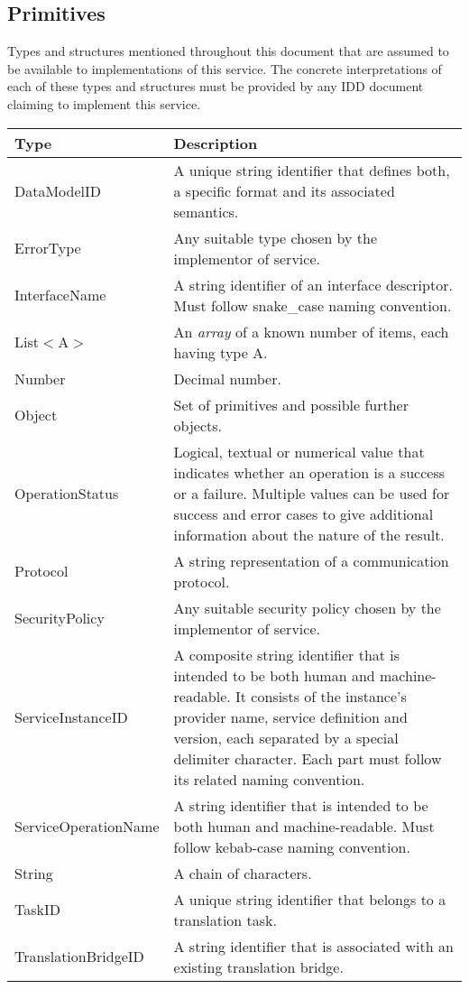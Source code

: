 \documentclass[a4paper]{arrowhead}
\newcommand{\pdef}[1]{{\textcolor{ArrowheadGrey}{#1\label{sec:model:primitives:#1}\label{sec:model:primitives:#1s}\label{sec:model:primitives:#1es}}}}
\begin{document}
\clearpage

\subsection{Primitives}
\label{sec:model:primitives}

Types and structures mentioned throughout this document that are assumed to be available to implementations of this service.
The concrete interpretations of each of these types and structures must be provided by any IDD document claiming to implement this service.

\begin{table}[ht!]
\begin{tabularx}{\textwidth}{| p{3.7cm} | X |} \hline
\rowcolor{gray!33} Type & Description \\ \hline
\pdef{DataModelID}      & A unique string identifier that defines both, a specific format and its associated semantics. \\ \hline
\pdef{ErrorType}        & Any suitable type chosen by the implementor of service. \\ \hline
\pdef{InterfaceName}    & A string identifier of an interface descriptor. Must follow snake\_case naming convention. \\ \hline
\pdef{List}$<$A$>$      & An \textit{array} of a known number of items, each having type A. \\ \hline
\pdef{Number}           & Decimal number. \\ \hline
\pdef{Object}           & Set of primitives and possible further objects. \\ \hline
\pdef{OperationStatus}  & Logical, textual or numerical value that indicates whether an operation is a success or a failure. Multiple values can be used for success and error cases to give additional information about the nature of the result. \\ \hline
\pdef{Protocol}         & A string representation of a communication protocol. \\ \hline
\pdef{SecurityPolicy}   & Any suitable security policy chosen by the implementor of service. \\ \hline
\pdef{ServiceInstanceID} & A composite string identifier that is intended to be both human and machine-readable. It consists of the instance's provider name, service definition and version, each separated by a special delimiter character. Each part must follow its related naming convention. \\ \hline
\pdef{ServiceOperationName}      & A string identifier that is intended to be both human and machine-readable. Must follow kebab-case naming convention. \\ \hline
\pdef{String}           & A chain of characters. \\ \hline
\pdef{TaskID}           & A unique string identifier that belongs to a translation task. \\ \hline
\pdef{TranslationBridgeID}       & A string identifier that is associated with an existing translation bridge. \\ \hline
\end{tabularx}
\end{table}
\end{document}
